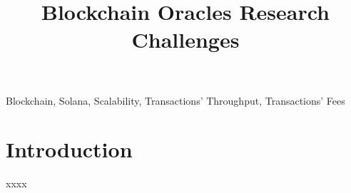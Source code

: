 \documentclass[10pt, conference, compsocconf]{IEEEtran}
\begin{document}
\title{Blockchain Oracles Research Challenges}

\author{
    \and 
}
\maketitle
\begin{abstract}


\end{abstract}
\renewcommand{\IEEEkeywordsname}{Keywords}
\begin{IEEEkeywords}
Blockchain, Solana, Scalability, Transactions' Throughput, Transactions' Fees
\end{IEEEkeywords}

%
\IEEEpeerreviewmaketitle

\section{Introduction}
\label{sec:introduction}
xxxx~\cite{pierro2020organized}





\end{document}

